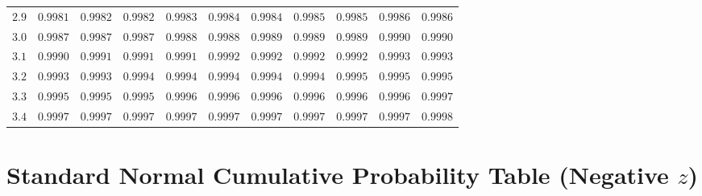 \documentclass[11pt]{article}
\begin{document}
\begin{tabular}{c*{10}{r}}
$2.9$ & $0.9981$ & $0.9982$ & $0.9982$ & $0.9983$ & $0.9984$ & $0.9984$ & $0.9985$ & $0.9985$ & $0.9986$ & $0.9986$ \\
$3.0$ & $0.9987$ & $0.9987$ & $0.9987$ & $0.9988$ & $0.9988$ & $0.9989$ & $0.9989$ & $0.9989$ & $0.9990$ & $0.9990$ \\
$3.1$ & $0.9990$ & $0.9991$ & $0.9991$ & $0.9991$ & $0.9992$ & $0.9992$ & $0.9992$ & $0.9992$ & $0.9993$ & $0.9993$ \\
$3.2$ & $0.9993$ & $0.9993$ & $0.9994$ & $0.9994$ & $0.9994$ & $0.9994$ & $0.9994$ & $0.9995$ & $0.9995$ & $0.9995$ \\
$3.3$ & $0.9995$ & $0.9995$ & $0.9995$ & $0.9996$ & $0.9996$ & $0.9996$ & $0.9996$ & $0.9996$ & $0.9996$ & $0.9997$ \\
$3.4$ & $0.9997$ & $0.9997$ & $0.9997$ & $0.9997$ & $0.9997$ & $0.9997$ & $0.9997$ & $0.9997$ & $0.9997$ & $0.9998$ \\
\bottomrule
\end{tabular}
\normalsize

\clearpage
\section*{Standard Normal Cumulative Probability Table (Negative $z$)}
\end{document}
